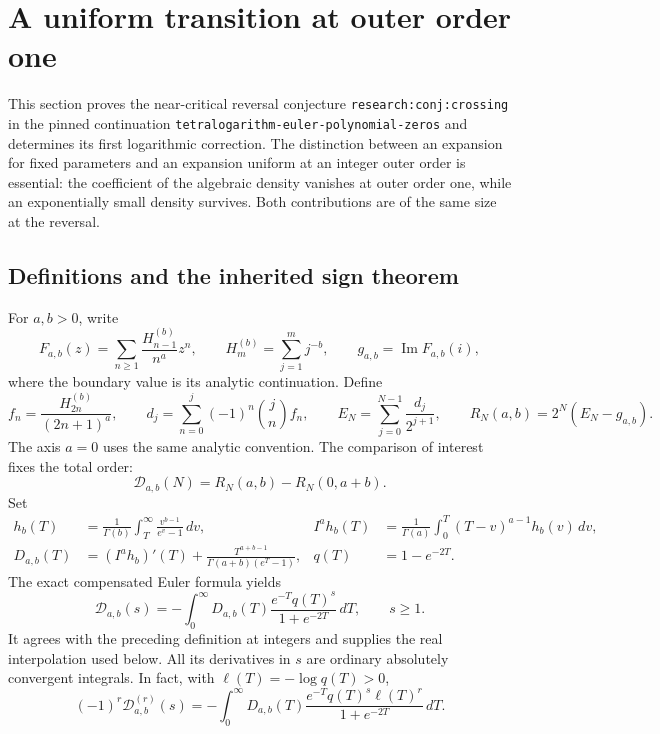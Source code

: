 \section{A uniform transition at outer order one}
\label{eutrans:sec:main}

This section proves the near-critical reversal conjecture
\texttt{research:conj:crossing} in the pinned continuation
\texttt{tetralogarithm-euler-polynomial-zeros} and determines its first
logarithmic correction. The distinction between an expansion for fixed
parameters and an expansion uniform at an integer outer order is essential:
the coefficient of the algebraic density vanishes at outer order one,
while an exponentially small density survives. Both contributions are
of the same size at the reversal.

\subsection{Definitions and the inherited sign theorem}

For $a,b>0$, write
\[
 F_{a,b}(z)=\sum_{n\geq1}\frac{H_{n-1}^{(b)}}{n^a}z^n,
 \qquad H_m^{(b)}=\sum_{j=1}^m j^{-b},
 \qquad g_{a,b}=\operatorname{Im}F_{a,b}(i),
\]
where the boundary value is its analytic continuation. Define
\[
 f_n=\frac{H_{2n}^{(b)}}{(2n+1)^a},\qquad
 d_j=\sum_{n=0}^j(-1)^n\binom jn f_n,\qquad
 E_N=\sum_{j=0}^{N-1}\frac{d_j}{2^{j+1}},\qquad
 R_N(a,b)=2^N(E_N-g_{a,b}).
\]
The axis $a=0$ uses the same analytic convention. The comparison of
interest fixes the total order:
\[
 \mathcal D_{a,b}(N)=R_N(a,b)-R_N(0,a+b).
\]
Set
\begin{align}
 h_b(T)&=\frac1{\Gamma(b)}\int_T^\infty
                    \frac{v^{b-1}}{e^v-1}\,dv,
 & I^ah_b(T)&=\frac1{\Gamma(a)}\int_0^T(T-v)^{a-1}h_b(v)\,dv,
 \label{eutrans:eq:seed}\\
 D_{a,b}(T)&=(I^ah_b)'(T)
              +\frac{T^{a+b-1}}{\Gamma(a+b)(e^T-1)},
 & q(T)&=1-e^{-2T}.
 \label{eutrans:eq:density}
\end{align}
The exact compensated Euler formula yields
\begin{equation}\label{eutrans:eq:interpolation}
 \mathcal D_{a,b}(s)=-\int_0^\infty D_{a,b}(T)
          \frac{e^{-T}q(T)^s}{1+e^{-2T}}\,dT,
 \qquad s\geq1.
\end{equation}
It agrees with the preceding definition at integers and supplies the
real interpolation used below. All its derivatives in $s$ are ordinary
absolutely convergent integrals. In fact, with
$\ell(T)=-\log q(T)>0$,
\begin{equation}\label{eutrans:eq:derivatives}
 (-1)^r\mathcal D_{a,b}^{(r)}(s)
 =-\int_0^\infty D_{a,b}(T)
    \frac{e^{-T}q(T)^s\ell(T)^r}{1+e^{-2T}}\,dT.
\end{equation}

